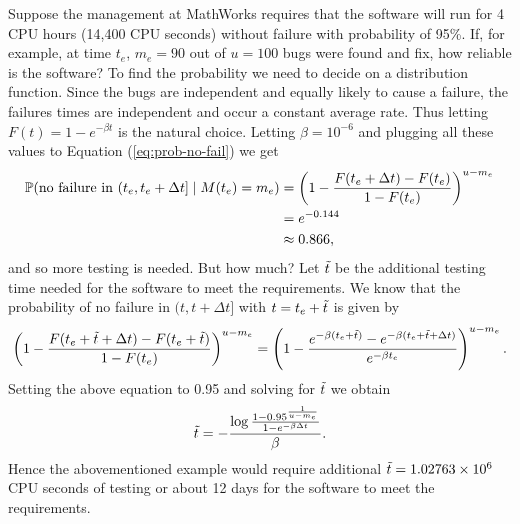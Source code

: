 Suppose the management at MathWorks requires that the software will run for 4 CPU hours (14,400 CPU seconds) without failure with probability of 95\%. If, for example, at time $t_e$, $m_e=90$ out of $u=100$ bugs were found and fix, how reliable is the software?
To find the probability we need to decide on a distribution function. Since the bugs are independent and equally likely to cause a failure, the failures times are independent and occur a constant average rate. Thus letting $F(t)=1-e^{-\beta t}$ is the natural choice. Letting $\beta=10^{-6}$ and plugging all these values to Equation (\ref{eq:prob-no-fail}) we get
\begin{align*}
    \mathbb{P}(\text{no failure in } (t_e, t_e+\Delta t] \; | \; M(t_e) = m_e) &= \left(1 -\frac{F(t_e+\Delta t) - F(t_e)}{1 - F(t_e)}\right)^{u-m_e}\\&=e^{-0.144}\\&\approx0.866,
\end{align*}
and so more testing is needed. But how much? Let $\Tilde{t}$ be the additional testing time needed for the software to meet the requirements. We know that the probability of no failure in $(t, t+\Delta t]$ with $t=t_e+\Tilde{t}$ is given by 
$$
    \left(1-\frac{F(t_e+\Tilde{t}+\Delta t)-F(t_e+\Tilde{t})}{1-F(t_e)}\right)^{u-m_e}=\left(1-\frac{e^{-\beta(t_e+\Tilde{t})}-e^{-\beta(t_e+\Tilde{t}+\Delta t)}}{e^{-\beta t_e}}\right)^{u-m_e}.
$$
Setting the above equation to 0.95 and solving for $\Tilde{t}$ we obtain
\begin{equation}\label{eq:remaining-time}
    \Tilde{t}=-\frac{\log \frac{1-0.95^{\frac{1}{u-m_e}}}{1-e^{-\beta\Delta t}}}{\beta}.
\end{equation}
Hence the abovementioned example would require additional $\Tilde{t}=1.02763\times 10^6$ CPU seconds of testing or about 12 days for the software to meet the requirements.